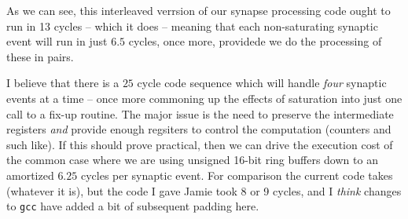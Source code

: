 As we can see, this interleaved verrsion of our synapse processing
code ought to run in 13 cycles -- which it does -- meaning that each
non-saturating synaptic event will run in just $6.5$ cycles, once
more, providede we do the processing of these in pairs.

I believe that there is a $25$ cycle code sequence which will handle
{\em four} synaptic events at a time -- once more commoning up the
effects of saturation into just one call to a fix-up routine. The
major issue is the need to preserve the intermediate registers {\em
  and} provide enough regsiters to control the computation (counters
and such like). If this should prove practical, then we can drive the
execution cost of the common case where we are using unsigned 16-bit
ring buffers down to an amortized $6.25$ cycles per synaptic event.
For comparison the current code takes (whatever it is), but the code I
gave Jamie took 8 or 9 cycles, and I {\em think}  changes to {\tt gcc} 
have added a bit of subsequent padding here.
